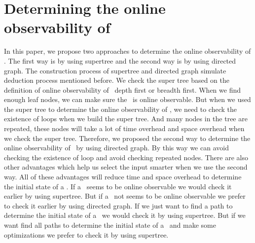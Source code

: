 \section{Determining the online observability of \BCNs}
\label{sec:deter}
In this paper, we propose two approaches to determine the online observability of \BCNs. The first way is by using supertree and the second way is by using directed graph. The construction process of supertree and directed graph simulate deduction process mentioned before. We check the super tree based on the definition of online observability of \BCNs\ depth first or breadth first. When we find enough leaf nodes, we can make sure the \BCN\ is online observable. But when we used the super tree to determine the online observability of \BCNs, we need to check the existence of loops when we build the super tree. And many nodes in the tree are repeated, these nodes will take a lot of time overhead and space overhead when we check the super tree. Therefore, we proposed the second way to determine the online observability of \BCNs\ by using directed graph. By this way we can avoid checking the existence of loop and avoid checking repeated nodes. There are also other advantages which help us select the input smarter when we use the second way. All of these advantages will reduce time and space overhead to determine the initial state of a \BCN. If a \BCN\ seems to be online observable we would check it earlier by using supertree. But if a  \BCN\ not seems to be online observable we prefer to check it earlier by using directed graph. If we just want to find a path to determine the initial state of a \BCN\ we would check it by using supertree. But if we want find all paths to determine the initial state of a \BCN\ and make some optimizations we prefer to check it by using supertree.

